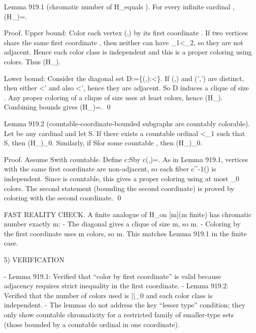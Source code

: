 Lemma 919.1 (chromatic number of H_\kappa equals \kappa).
For every infinite cardinal \kappa, \chi(H_\kappa)=\kappa.

Proof.
Upper bound: Color each vertex (\alpha,\beta) by its first coordinate \alpha.
If two vertices share the same first coordinate \alpha, then neither can have \alpha_1<\alpha_2, so they are not adjacent.
Hence each color class is independent and this is a proper coloring using \kappa colors.
Thus \chi(H_\kappa)\le \kappa.

Lower bound: Consider the diagonal set D:=\{(\alpha,\alpha):\alpha<\kappa\}.
If (\alpha,\alpha) and (\alpha',\alpha') are distinct, then either \alpha<\alpha' and also \alpha<\alpha', hence they are adjacent.
So D induces a clique of size \kappa.
Any proper coloring of a clique of size \kappa uses at least \kappa colors, hence \chi(H_\kappa)\ge \kappa.
Combining bounds gives \chi(H_\kappa)=\kappa. \qed

Lemma 919.2 (countable-coordinate-bounded subgraphs are countably colorable).
Let \kappa be any cardinal and let S\subseteq \kappa\times\kappa.
If there exists a countable ordinal \gamma<\omega_1 such that S\subseteq \gamma\times\kappa, then \chi(H_\kappa[S])\le \aleph_0.
Similarly, if S\subseteq \kappa\times\gamma for some countable \gamma, then \chi(H_\kappa[S])\le \aleph_0.

Proof.
Assume S\subseteq \gamma\times\kappa with \gamma countable.
Define c:S\to\gamma by c(\alpha,\beta)=\alpha.
As in Lemma 919.1, vertices with the same first coordinate are non-adjacent, so each fiber c^{-1}(\alpha) is independent.
Since \gamma is countable, this gives a proper coloring using at most \aleph_0 colors.
The second statement (bounding the second coordinate) is proved by coloring with the second coordinate. \qed

FAST REALITY CHECK.
A finite analogue of H_\kappa on [m]\times[m] (m finite) has chromatic number exactly m:
- The diagonal gives a clique of size m, so \chi\ge m.
- Coloring by the first coordinate uses m colors, so \chi\le m.
This matches Lemma 919.1 in the finite case.


5) VERIFICATION

- Lemma 919.1: Verified that “color by first coordinate” is valid because adjacency requires strict inequality in the first coordinate.
- Lemma 919.2: Verified that the number of colors used is |\gamma|\le\aleph_0 and each color class is independent.
- The lemmas do not address the key “lesser type” condition; they only show countable chromaticity for a restricted family of smaller-type sets (those bounded by a countable ordinal in one coordinate).


